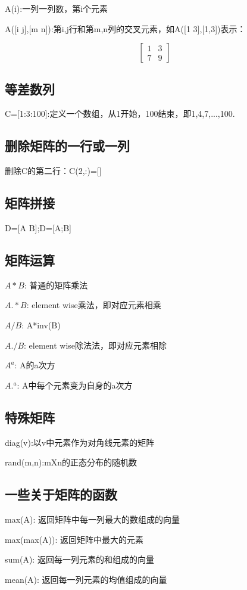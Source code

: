 \documentclass{ctexart}
\begin{document}
	A(i):一列一列数，第i个元素
	
	A([i j],[m n]):第i,j行和第m,n列的交叉元素，如A([1 3],[1,3])表示：
	
	$$ 
	\begin{bmatrix}
	1 & 3 \\
	7 & 9
	\end{bmatrix} $$
	
	\subsection{等差数列}
	C=[1:3:100]:定义一个数组，从1开始，100结束，即1,4,7,...,100.
	
	\subsection{删除矩阵的一行或一列}
	删除C的第二行：C(2,:)=[]
	
	\subsection{矩阵拼接}
	D=[A B];D=[A;B]
	
	\subsection{矩阵运算}
	$ A*B $: 普通的矩阵乘法
	
	$ A.*B $: element wise乘法，即对应元素相乘
	
	$ A/B $: A*inv(B)
	
	$ A./B $: element wise除法法，即对应元素相除
	
	$ A^a $: A的a次方
	
	$ A.^a $: A中每个元素变为自身的a次方
	
	\subsection{特殊矩阵}
	diag(v):以v中元素作为对角线元素的矩阵
	
	rand(m,n):mXn的正态分布的随机数
	
	\subsection{一些关于矩阵的函数}
	max(A): 返回矩阵中每一列最大的数组成的向量
	
	max(max(A)): 返回矩阵中最大的元素
	
	sum(A): 返回每一列元素的和组成的向量
	
	mean(A): 返回每一列元素的均值组成的向量
\end{document}
